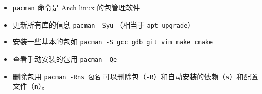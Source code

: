 
\begin{issues}
\issueDraft
\end{issues}

\begin{itemize}
\item \verb|pacman| 命令是 Arch linux 的包管理软件
\item 更新所有库的信息 \verb|pacman -Syu| （相当于 \verb|apt upgrade|）
\item 安装一些基本的包如 \verb|pacman -S gcc gdb git vim make cmake|
\item 查看手动安装的包用 \verb`pacman -Qe`
\item 删除包用 \verb`pacman -Rns 包名` 可以删除包（\verb`-R`）和自动安装的依赖（\verb`s`）和配置文件（\verb`n`）。
\end{itemize}
